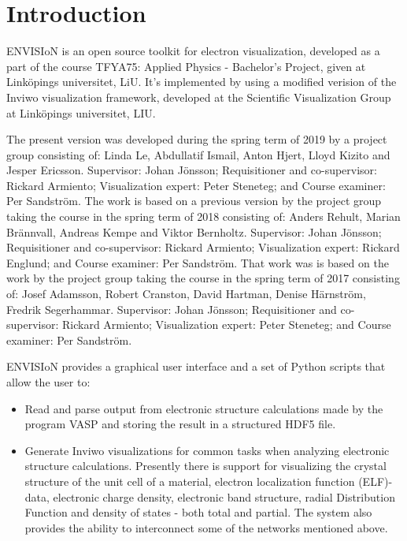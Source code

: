 \section{Introduction}
\label{ch:intro}
ENVISIoN is an open source toolkit for electron visualization, developed as a part of the course TFYA75: Applied Physics - Bachelor's Project, given at Linköpings universitet, LiU. It's implemented by using a modified verision of the Inviwo visualization framework, developed at the Scientific Visualization Group at Linköpings universitet, LIU.

The present version was developed during the spring term of 2019 by a project group consisting of: Linda Le, Abdullatif Ismail, Anton Hjert, Lloyd Kizito and Jesper Ericsson. Supervisor: Johan Jönsson; Requisitioner and co-supervisor: Rickard Armiento; Visualization expert: Peter Steneteg; and Course examiner: Per Sandström. The work is based on a previous version by the project group taking the course in the spring term of 2018 consisting of: Anders Rehult, Marian Brännvall, Andreas Kempe and Viktor Bernholtz. Supervisor: Johan Jönsson; Requisitioner and co-supervisor: Rickard Armiento; Visualization expert: Rickard Englund; and Course examiner: Per Sandström. That work was is based on the work by the project group taking the course in the spring term of 2017 consisting of: Josef Adamsson, Robert Cranston, David Hartman, Denise Härnström, Fredrik Segerhammar. Supervisor: Johan Jönsson; Requisitioner and co-supervisor: Rickard Armiento; Visualization expert: Peter Steneteg; and Course examiner: Per Sandström.

ENVISIoN provides a graphical user interface and a set of Python scripts that allow the user to:
\begin{itemize}
    \item Read and parse output from electronic structure calculations made by the program VASP and storing the result in a structured HDF5 file.
    
    \item Generate Inviwo visualizations for common tasks when analyzing electronic structure calculations. Presently there is support for visualizing the crystal structure of the unit cell of a material, electron localization function (ELF)-data, electronic charge density, electronic band structure, radial Distribution Function and density of states - both total and partial. The system also provides the ability to interconnect some of the networks mentioned above.
\end{itemize}